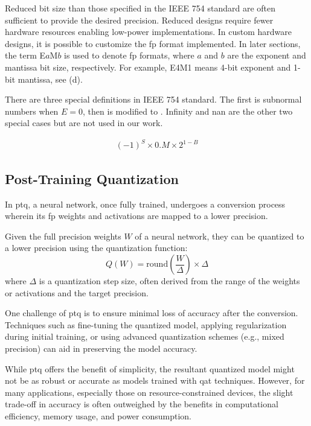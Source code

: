Reduced bit size than those specified in the IEEE 754 standard are often sufficient to provide the desired precision. Reduced designs require fewer hardware resources enabling low-power implementations. In custom hardware designs, it is possible to customize the \gls{fp} format implemented. In later sections, the term E$a$M$b$ is used to denote \gls{fp} formats, where $a$ and $b$ are the exponent and mantissa bit size, respectively. For example, E4M1 means 4-bit exponent and 1-bit mantissa, see (d).

There are three special definitions in IEEE 754 standard. The first is subnormal numbers when $E=0$, then  is modified to . Infinity and \gls{nan} are the other two special cases but are not used in our work.

\begin{eqnarray} \label{eq:float_subnorm}
(-1)^{S} \times 0.M \times 2^{1-B}
\end{eqnarray}

\subsection{Post-Training Quantization}

In \gls{ptq}, a neural network, once fully trained, undergoes a conversion process wherein its \gls{fp} weights and activations are mapped to a lower precision.

Given the full precision weights \( W \) of a neural network, they can be quantized to a lower precision using the quantization function:
\begin{equation}
Q(W) = \text{round}\left(\frac{W}{\Delta}\right) \times \Delta
\end{equation}
where \( \Delta \) is a quantization step size, often derived from the range of the weights or activations and the target precision.

One challenge of \gls{ptq} is to ensure minimal loss of accuracy after the conversion. Techniques such as fine-tuning the quantized model, applying regularization during initial training, or using advanced quantization schemes (e.g., mixed precision) can aid in preserving the model accuracy.

While \gls{ptq} offers the benefit of simplicity, the resultant quantized model might not be as robust or accurate as models trained with \gls{qat} techniques. However, for many applications, especially those on resource-constrained devices, the slight trade-off in accuracy is often outweighed by the benefits in computational efficiency, memory usage, and power consumption.


